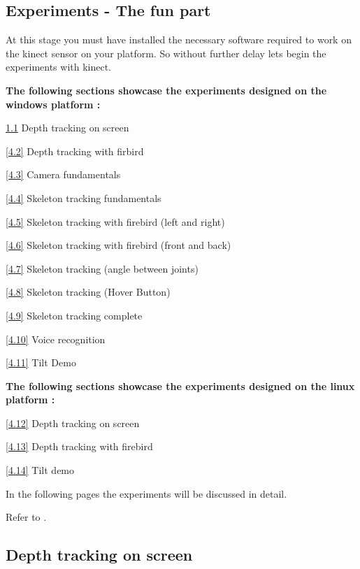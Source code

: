 

\begin{flushleft}

\chapter{Experiments - The fun part}

At this stage you must have installed the necessary software required to work on the kinect sensor on your platform. So without further delay lets begin the experiments with kinect.
\medskip

\textbf{The following sections showcase the experiments designed on the windows platform :}

\ref{4.1} Depth tracking on screen

\ref{4.2} Depth tracking with firbird

\ref{4.3} Camera fundamentals

\ref{4.4} Skeleton tracking fundamentals

\ref{4.5} Skeleton tracking with firebird (left and right)

\ref{4.6} Skeleton tracking with firebird (front and back)

\ref{4.7} Skeleton tracking (angle between joints)

\ref{4.8} Skeleton tracking (Hover Button)

\ref{4.9} Skeleton tracking complete

\ref{4.10} Voice recognition

\ref{4.11} Tilt Demo

\medskip

\textbf{The following sections showcase the experiments designed on the linux platform :}

\ref{4.12} Depth tracking on screen

\ref{4.13} Depth tracking with firebird

\ref{4.14} Tilt demo

\medskip

In the following pages the experiments will be discussed in detail.

Refer to \cite{skeleton1} \cite{video} \cite{serial} \cite{skeleton2} \cite{skeleton3} \cite{skeleton4} \cite{audio1} \cite{audio2}.
\newpage

\medskip
\section{\textbf{ Depth tracking on screen}}
\label{4.1}


\end{flushleft}
